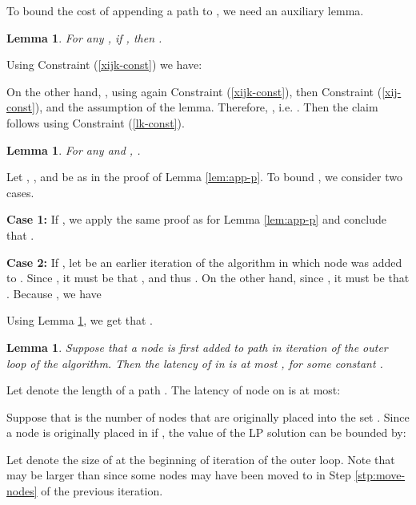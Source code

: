 \documentclass[11pt]{article}
\newcommand{\qed}{\hspace*{\fill}}
\newtheorem{lemma}[theorem]{Lemma}
\newenvironment{proof}[1][Proof. ]{\noindent {\bf #1 }}{\qed}
\begin{document}
\medskip



To bound the cost of appending a path  to , we need an auxiliary lemma.

\begin{lemma} \label{lem:ijk}
For any , if , then .
\end{lemma}
\begin{proof}
Using Constraint (\ref{xijk-const}) we have:


On the other hand, , 
using again Constraint (\ref{xijk-const}), then Constraint (\ref{xij-const}), and the assumption of the lemma.
Therefore,  , i.e. .  
Then the claim follows using Constraint (\ref{lk-const}).
\end{proof}

\begin{lemma} \label{lem:app-pij}
For any  and , .
\end{lemma}
\begin{proof}
Let , , and  be as in the proof of Lemma \ref{lem:app-p}.
To bound , we consider two cases.

{\bf Case 1:} If , we apply the same proof as for Lemma \ref{lem:app-p} and conclude that .

{\bf Case 2:} If , let  be an earlier iteration of the algorithm in which node  was added to . Since , it must be that , and thus . On the other hand, since , it must be that . Because , we have

Using Lemma \ref{lem:ijk}, we get that 
. 
\end{proof}



\begin{lemma}\label{lem:Pi-late}
Suppose that a node  is first added to path  in iteration  of the outer loop of the algorithm. Then the latency of  in  is at most , for some constant .
\end{lemma}
\begin{proof}
Let  denote the length of a path .  The latency of node  on  is at most:

\end{proof}

\medskip



Suppose that  is the number of nodes that are originally placed into the set  . Since a node  is originally placed in  if , the value of the LP solution  can be bounded by:



Let  denote the size of  at the beginning of iteration  of the outer loop. Note that  may be larger than  since some nodes may have been moved to  in Step \ref{stp:move-nodes} of the previous iteration.
\end{document}
